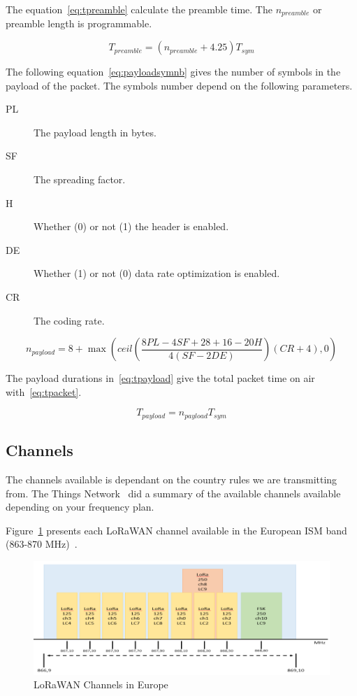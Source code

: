 The equation~\ref{eq:tpreamble} calculate the preamble time. The $n_{preamble}$
or preamble length is programmable.

\begin{equation}
  \label{eq:tpreamble}
  T_{preamble} = (n_{preamble} + 4.25)T_{sym}
\end{equation}

The following equation~\ref{eq:payloadsymnb} gives the number of symbols in the
payload of the packet.
The symbols number depend on the following parameters.

\begin{description}
  \item[PL] The payload length in bytes.
  \item[SF] The spreading factor.
  \item[H] Whether (0) or not (1) the header is enabled.
  \item[DE] Whether (1) or not (0) data rate optimization is enabled.
  \item[CR] The coding rate.
\end{description}

\begin{equation}
  \label{eq:payloadsymnb}
  n_{payload} = 8 + \max(ceil(\frac{8PL - 4SF + 28 + 16 - 20H}{4(SF - 2DE)})(CR + 4),0)
\end{equation}

The payload durations in~\ref{eq:tpayload} give the total packet time on air
with~\ref{eq:tpacket}.

\begin{equation}
  \label{eq:tpayload}
  T_{payload} = n_{payload} T_{sym}
\end{equation}


\subsection{Channels}

The channels available is dependant on the country rules we are transmitting from.
The Things Network~\cite{ttnfrequencyplans} did a summary of the available
channels available depending on your frequency plan.

Figure~\ref{fig:channels} presents each LoRaWAN channel available in the
European ISM band (863-870 MHz)~\cite{Polonelli_2019}.

\begin{figure}[H]
  \centering
  \includegraphics[width=\textwidth]{thesis.tex/chapters/context/fig/channels.png}
  \caption{LoRaWAN Channels in Europe\cite{Polonelli_2019}\label{fig:channels}}
\end{figure}

